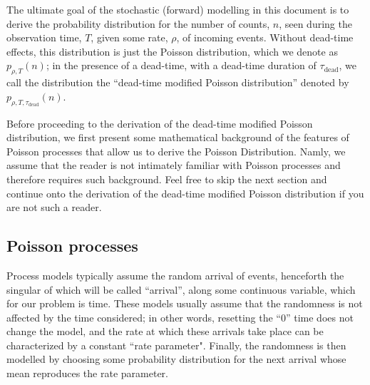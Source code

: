 \documentclass{article}
\newcommand{\dead}{\tau_{\text{dead}}}
\begin{document}
The ultimate goal of the stochastic (forward) modelling in this document 
is to derive the probability distribution for the number
of counts, $n$, seen during the observation time, $T$, 
given some rate, $\rho$, of incoming events.
Without dead-time effects, this distribution is just the 
Poisson distribution, which we denote as $p_{\rho, T}(n)$;
in the presence of a dead-time, with a dead-time duration of $\dead$,
we call the distribution the ``dead-time modified Poisson distribution''
denoted by $p_{\rho, T, \dead}(n)$.

Before proceeding to the derivation of the dead-time modified Poisson 
distribution, we first 
present some mathematical background of the features
of Poisson processes that allow us to derive the Poisson Distribution.
Namly, we assume that the reader is not intimately familiar with Poisson processes
and therefore requires such background.  Feel free to skip the next
section and continue onto the derivation of the dead-time modified
Poisson distribution if you are not such a reader.

\subsection{Poisson processes}

Process models typically assume the random arrival of events, henceforth 
the singular of which will be called ``arrival'', along some continuous 
variable, which for our problem is time.   These models usually assume that
the randomness is not affected by the time considered; in other words, resetting
the ``0'' time does not change the model, and the rate at which these arrivals take
place can be characterized by a constant ``rate parameter".
Finally, the randomness is then modelled by
choosing some probability distribution for the next arrival whose mean reproduces the
rate parameter.
\end{document}
